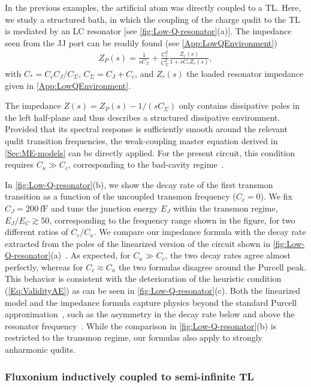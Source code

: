 \documentclass[prx,aps,twocolumn,article]{revtex4-2}
\begin{document}
In the previous examples, the artificial atom was directly coupled to a \gls{TL}. Here, we study a structured bath, in which the coupling of the charge qudit to the \gls{TL} is mediated by an LC resonator [see \cref{fig:Low-Q-resonator}(a)]. The impedance seen from the \gls{JJ} port can be readily found (see \cref{App:LowQEnvironment})
\begin{align}
    Z_P(s)
    =
    \frac{1}{sC_\Sigma}+
    \frac{C_c^2}{C_\Sigma^2}
    \frac{Z_r(s)}{1+sC_\ast Z_r(s)},
\end{align}
with $C_\ast=C_c C_J/C_\Sigma$, $C_\Sigma=C_J+C_c$, and $Z_r(s)$ the loaded resonator impedance given in \cref{App:LowQEnvironment}. 

The impedance $Z(s)= Z_P(s)-1/(sC_\Sigma)$ only contains dissipative poles in the left half-plane and thus describes a structured dissipative environment. Provided that its spectral response is sufficiently smooth around the relevant qudit transition frequencies, the weak-coupling master equation derived in \cref{Sec:ME-models} can be directly applied. For the present circuit, this condition requires $C_\kappa\gg C_c$, corresponding to the bad-cavity regime~\cite{Blais:2021}.


In \cref{fig:Low-Q-resonator}(b), we show the decay rate of the first transmon transition as a function of the uncoupled transmon frequency ($C_c=0$). We fix $C_J=200~\mathrm{fF}$ and tune the junction energy $E_J$ within the transmon regime, $E_J/E_C\gtrsim 50$, corresponding to the frequency range shown in the figure, for two different ratios of $C_c/C_\kappa$. We compare our impedance formula with the decay rate extracted from the poles of the linearized version of the circuit shown in \cref{fig:Low-Q-resonator}(a)~\cite{Houck:2008,Hassler:2019}. As expected, for $C_\kappa\gg C_c$, the two decay rates agree almost perfectly, whereas for $C_c\approx C_\kappa$ the two formulas disagree around the Purcell peak. This behavior is consistent with the deterioration of the heuristic condition (\ref{Eq:ValidityAE}) as can be seen in \cref{fig:Low-Q-resonator}(c). Both the linearized model and the impedance formula capture physics beyond the standard Purcell approximation~\cite{purcell:1946,Blais:2021}, such as the asymmetry in the decay rate below and above the resonator frequency~\cite{Houck:2008}. While the comparison in \cref{fig:Low-Q-resonator}(b) is restricted to the transmon regime, our formulas also apply to strongly anharmonic qudits.

\subsubsection{Fluxonium inductively coupled to semi-infinite TL}
\label{Sec:ExampleFluxoniumInductive}
\end{document}
